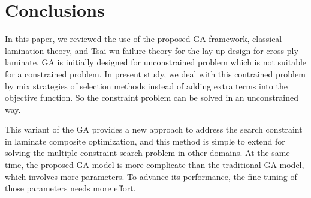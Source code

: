 \section{Conclusions}
In this paper, we reviewed the use of the proposed GA framework, classical
lamination theory, and Tsai-wu failure theory for the lay-up design for cross
ply laminate. GA is initially designed for unconstrained problem which is not
suitable for a constrained problem. In present study, we deal with this
contrained problem by mix strategies of selection methods instead of adding
extra terms into the objective function. So the constraint problem  can be
solved in an unconstrained way.

This variant of the GA provides a new approach to address the search constraint
in laminate composite optimization, and this method is simple to extend for
solving the multiple constraint search problem in other domains. At the same
time, the proposed GA model is more complicate than the traditional GA model,
which involves more parameters. To advance its performance, the fine-tuning of
those parameters needs more effort. 
